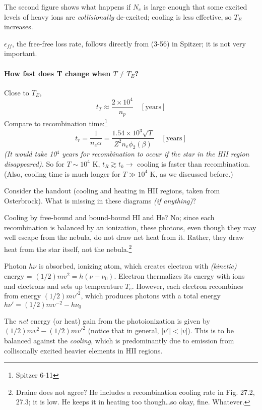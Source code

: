\documentclass[11pt]{article}
\newcommand{\mar}[1]{\hspace{0pt}\marginpar{-\textcolor{black}{#1}-}}
\newcommand{\mynotes}[1]{{\fontfamily{cmss}\selectfont \textit{#1}}}
\begin{document}
The second figure shows what happens if $N_{e}$ is large enough that some
excited levels of heavy ions are \emph{collisionally} de-excited;
cooling is less effective, so $T_{E}$ increases.

$\epsilon_{ff}$, the free-free loss rate, follows directly from
(3-56) in Spitzer; it is not very important.

\paragraph{How fast does T change when $T \neq T_{E}$?}
Close to $T_{E}$,
\[
    t_{T} \approx \frac{2\times10^{4}}{n_{p}} \quad [\mathrm{years}]
    \]
Compare to recombination time:\footnote{Spitzer 6-11}
\[
    t_{r} = \frac{1}{n_{e}\alpha}
    = \frac{1.54\times10^{3}\sqrt{T}}{Z^{2}n_{e}\phi_{2}(\beta)}
    \quad [\mathrm{years}]
    \]
\mynotes{(It would take 10$^{4}$ years for recombination to occur if
the star in the HII region disappeared).}
So for $T \sim 10^{4}$ K, $t_{R} \gtrsim t_{k} \rightarrow$
cooling is faster than recombination. (Also, cooling time is much longer
for $T \gg 10^{4}$ K, as we discussed before.)

\mar{159}Consider the handout (cooling and heating in HII regions, taken from
Osterbrock). What is missing in these diagrams \mynotes{(if anything)}?

Cooling by free-bound and bound-bound HI and He? No; since each recombination
is balanced by an ionization, these photons, even though they may well escape
from the nebula, do not draw net heat from it. Rather, they draw heat from the
star itself, not the nebula.\footnote{Draine does not agree? He includes a
recombination cooling rate in Fig. 27.2, 27.3; it is low. He keeps it in
heating too though\ldots so okay, fine. Whatever.}

Photon $h\nu$ is absorbed, ionizing atom, which creates electron with
\mynotes{(kinetic)} energy = $(1/2)mv^{2} = h(\nu - \nu_{0}) $.
Electron thermalizes its energy with ions and electrons and
sets up temperature $T_{e}$.
However, each electron recombines from energy $(1/2)mv'^{2}$,
which produces photons with a total energy
$h\nu' = (1/2)mv^{-2} - h\nu_{0} $

The \emph{net} energy (or heat) gain from the photoionization is given by $
(1/2)mv^{2} - (1/2)mv'^{2} $ (notice that in general, $|v'| < |v|$). This is to
be balanced against the \emph{cooling}, which is predominantly due to emission
from collisonally excited heavier elements in HII regions.
\end{document}
